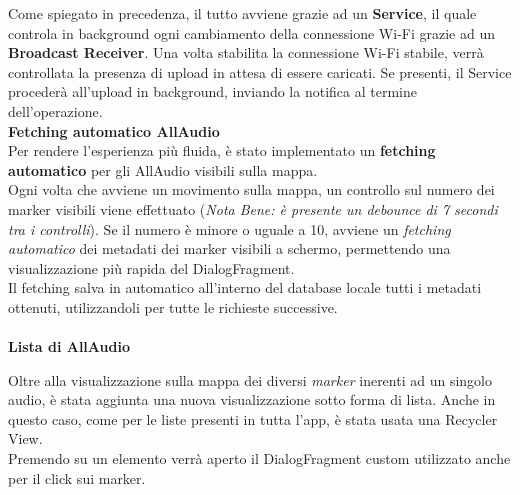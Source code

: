 \documentclass{article}
\begin{document}
Come spiegato in precedenza, il tutto avviene grazie ad un \textbf{Service}, il quale controla in background ogni cambiamento della connessione Wi-Fi grazie ad un \textbf{Broadcast Receiver}. Una volta stabilita la connessione Wi-Fi stabile, verrà controllata la presenza di upload in attesa di essere caricati. Se presenti, il Service procederà all'upload in background, inviando la notifica al termine dell'operazione.\vspace*{14pt}\\
\textbf{Fetching automatico AllAudio}\\
Per rendere l'esperienza più fluida, è stato implementato un \textbf{fetching automatico} per gli AllAudio visibili sulla mappa.\\
Ogni volta che avviene un movimento sulla mappa, un controllo sul numero dei marker visibili viene effettuato (\textit{Nota Bene: è presente un debounce di 7 secondi tra i controlli}). Se il numero è minore o uguale a 10, avviene un \textit{fetching automatico} dei metadati dei marker visibili a schermo, permettendo una visualizzazione più rapida del DialogFragment.\\
Il fetching salva in automatico all'interno del database locale tutti i metadati ottenuti, utilizzandoli per tutte le richieste successive.\vspace*{14pt}\\
\pagebreak
\quad \vspace*{0pt}\\
\textbf{Lista di AllAudio}\\
\begin{minipage}[t]{0.6\textwidth}
    \raggedright
    \vspace*{20pt}
    Oltre alla visualizzazione sulla mappa dei diversi \textit{marker} inerenti ad un singolo audio, è stata aggiunta una nuova visualizzazione sotto forma di lista. Anche in questo caso, come per le liste presenti in tutta l'app, è stata usata una Recycler View.\vspace*{14pt}\\
    Premendo su un elemento verrà aperto il DialogFragment custom utilizzato anche per il click sui marker.
\end{minipage}
\hfill
\end{document}
